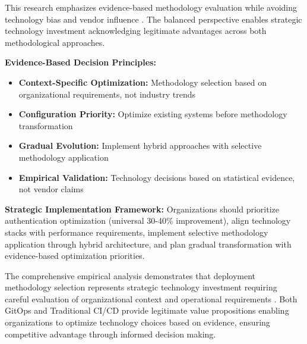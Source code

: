 This research emphasizes evidence-based methodology evaluation while avoiding technology bias and vendor influence \cite{strategic_technology_planning}. The balanced perspective enables strategic technology investment acknowledging legitimate advantages across both methodological approaches.

\textbf{Evidence-Based Decision Principles:}
\begin{itemize}
\item \textbf{Context-Specific Optimization:} Methodology selection based on organizational requirements, not industry trends
\item \textbf{Configuration Priority:} Optimize existing systems before methodology transformation
\item \textbf{Gradual Evolution:} Implement hybrid approaches with selective methodology application
\item \textbf{Empirical Validation:} Technology decisions based on statistical evidence, not vendor claims
\end{itemize}

\textbf{Strategic Implementation Framework:}
Organizations should prioritize authentication optimization (universal 30-40\% improvement), align technology stacks with performance requirements, implement selective methodology application through hybrid architecture, and plan gradual transformation with evidence-based optimization priorities.

The comprehensive empirical analysis demonstrates that deployment methodology selection represents strategic technology investment requiring careful evaluation of organizational context and operational requirements \cite{kim2016devops}. Both GitOps and Traditional CI/CD provide legitimate value propositions enabling organizations to optimize technology choices based on evidence, ensuring competitive advantage through informed decision making.